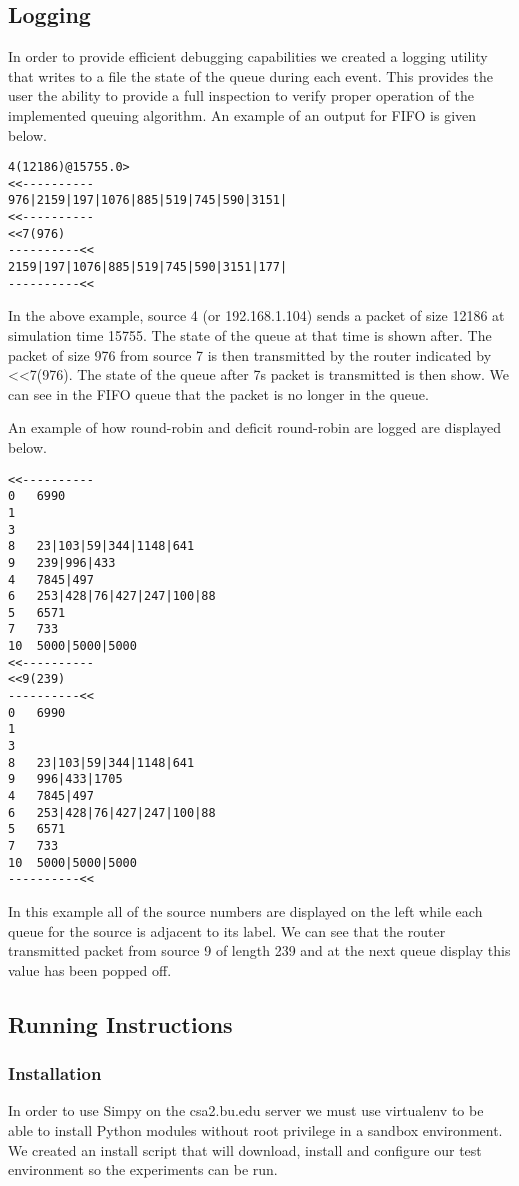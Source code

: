 \subsection{Logging}

In order to provide efficient debugging capabilities we created a logging utility that writes to a file the state of the queue during each event. This provides the user the ability to provide a full inspection to verify proper operation of the implemented queuing algorithm. An example of an output for FIFO is given below.

\begin{verbatim}
4(12186)@15755.0>
<<----------
976|2159|197|1076|885|519|745|590|3151|
<<----------
<<7(976)
----------<<
2159|197|1076|885|519|745|590|3151|177|
----------<<
\end{verbatim}

In the above example, source 4 (or 192.168.1.104) sends a packet of size 12186 at simulation time 15755. The state of the queue at that time is shown after. The packet of size 976 from source 7 is then transmitted by the router indicated by <<7(976). The state of the queue after 7s packet is transmitted is then show. We can see in the FIFO queue that the packet is no longer in the queue.

An example of how round-robin and deficit round-robin are logged are displayed below.

\begin{verbatim}
<<----------
0	6990
1	
3	
8	23|103|59|344|1148|641
9	239|996|433
4	7845|497
6	253|428|76|427|247|100|88
5	6571
7	733
10	5000|5000|5000
<<----------
<<9(239)
----------<<
0	6990
1	
3	
8	23|103|59|344|1148|641
9	996|433|1705
4	7845|497
6	253|428|76|427|247|100|88
5	6571
7	733
10	5000|5000|5000
----------<<
\end{verbatim}

In this example all of the source numbers are displayed on the left while each queue for the source is adjacent to its label. We can see that the router transmitted packet from source 9 of length 239 and at the next queue display this value has been popped off.



\subsection{Running Instructions}

\subsubsection{Installation}
In order to use Simpy on the csa2.bu.edu server we must use virtualenv to be able to install Python modules without root privilege in a sandbox environment. We created an install script that will download, install and configure our test environment so the experiments can be run.

